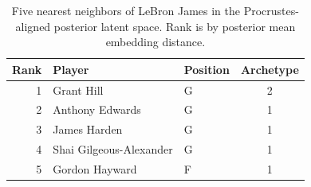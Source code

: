 \begin{table}[htbp]
  \centering\small
  \begin{tabular}{rllc}
    \toprule
    Rank & Player & Position & Archetype \\
    \midrule
    1 & Grant Hill & G & 2 \\
    2 & Anthony Edwards & G & 1 \\
    3 & James Harden & G & 1 \\
    4 & Shai Gilgeous-Alexander & G & 1 \\
    5 & Gordon Hayward & F & 1 \\
    \bottomrule
  \end{tabular}
  \caption{Five nearest neighbors of LeBron James in the Procrustes-aligned posterior latent space. Rank is by posterior mean embedding distance.}
  \label{tab:LeBron_James_neighbors}
\end{table}

